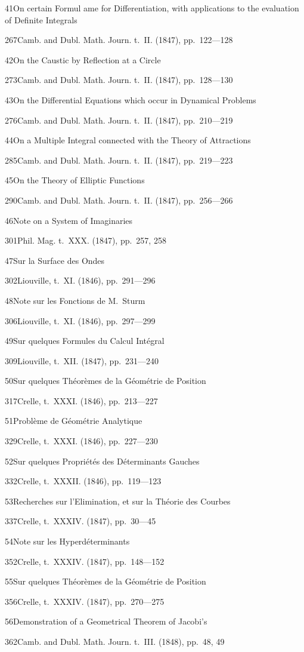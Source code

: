 \documentclass[11pt,a4paper]{book}
\providecommand{\tocentry}[2]{#1\dotfill #2\par}
\begin{document}
\tocentry{41}{On certain Formul
ame for Differentiation, with applications to the evaluation of Definite Integrals}{267}{Camb. and Dubl. Math. Journ. t.~II. (1847), pp.~122---128}

\tocentry{42}{On the Caustic by Reflection at a Circle}{273}{Camb. and Dubl. Math. Journ. t.~II. (1847), pp.~128---130}

\tocentry{43}{On the Differential Equations which occur in Dynamical Problems}{276}{Camb. and Dubl. Math. Journ. t.~II. (1847), pp.~210---219}

\tocentry{44}{On a Multiple Integral connected with the Theory of Attractions}{285}{Camb. and Dubl. Math. Journ. t.~II. (1847), pp.~219---223}

\tocentry{45}{On the Theory of Elliptic Functions}{290}{Camb. and Dubl. Math. Journ. t.~II. (1847), pp.~256---266}

\tocentry{46}{Note on a System of Imaginaries}{301}{Phil. Mag. t.~XXX. (1847), pp.~257, 258}

\newpage

\tocentry{47}{Sur la Surface des Ondes}{302}{Liouville, t.~XI. (1846), pp.~291---296}

\tocentry{48}{Note sur les Fonctions de M.~Sturm}{306}{Liouville, t.~XI. (1846), pp.~297---299}

\tocentry{49}{Sur quelques Formules du Calcul Int\'{e}gral}{309}{Liouville, t.~XII. (1847), pp.~231---240}

\tocentry{50}{Sur quelques Th\'{e}or\`{e}mes de la G\'{e}om\'{e}trie de Position}{317}{Crelle, t.~XXXI. (1846), pp.~213---227}

\tocentry{51}{Probl\`{e}me de G\'{e}om\'{e}trie Analytique}{329}{Crelle, t.~XXXI. (1846), pp.~227---230}

\tocentry{52}{Sur quelques Propri\'{e}t\'{e}s des D\'{e}terminants Gauches}{332}{Crelle, t.~XXXII. (1846), pp.~119---123}

\tocentry{53}{Recherches sur l'Elimination, et sur la Th\'{e}orie des Courbes}{337}{Crelle, t.~XXXIV. (1847), pp.~30---45}

\tocentry{54}{Note sur les Hyperd\'{e}terminants}{352}{Crelle, t.~XXXIV. (1847), pp.~148---152}

\tocentry{55}{Sur quelques Th\'{e}or\`{e}mes de la G\'{e}om\'{e}trie de Position}{356}{Crelle, t.~XXXIV. (1847), pp.~270---275}

\tocentry{56}{Demonstration of a Geometrical Theorem of Jacobi's}{362}{Camb. and Dubl. Math. Journ. t.~III. (1848), pp.~48, 49}
\end{document}
